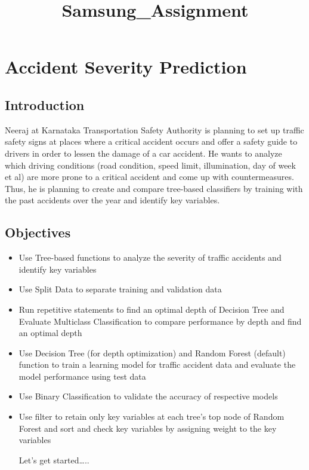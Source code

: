 \documentclass[11pt]{article}
\title{Samsung\_Assignment}
\providecommand{\tightlist}{%
      \setlength{\itemsep}{0pt}\setlength{\parskip}{0pt}}
\begin{document}
    
    
    \maketitle
    
    

    
    \hypertarget{accident-severity-prediction}{%
\section{Accident Severity
Prediction}\label{accident-severity-prediction}}

\hypertarget{introduction}{%
\subsection{Introduction}\label{introduction}}

Neeraj at Karnataka Transportation Safety Authority is planning to set
up traffic safety signs at places where a critical accident occurs and
offer a safety guide to drivers in order to lessen the damage of a car
accident. He wants to analyze which driving conditions (road condition,
speed limit, illumination, day of week et al) are more prone to a
critical accident and come up with countermeasures. Thus, he is planning
to create and compare tree-based classifiers by training with the past
accidents over the year and identify key variables.

\hypertarget{objectives}{%
\subsection{Objectives}\label{objectives}}

\begin{itemize}
\tightlist
\item
  Use Tree-based functions to analyze the severity of traffic accidents
  and identify key variables
\item
  Use Split Data to separate training and validation data
\item
  Run repetitive statements to find an optimal depth of Decision Tree
  and Evaluate Multiclass Classification to compare performance by depth
  and find an optimal depth
\item
  Use Decision Tree (for depth optimization) and Random Forest (default)
  function to train a learning model for traffic accident data and
  evaluate the model performance using test data
\item
  Use Binary Classification to validate the accuracy of respective
  models
\item
  Use filter to retain only key variables at each tree's top node of
  Random Forest and sort and check key variables by assigning weight to
  the key variables

  Let's get started\ldots..
\end{itemize}
\end{document}
